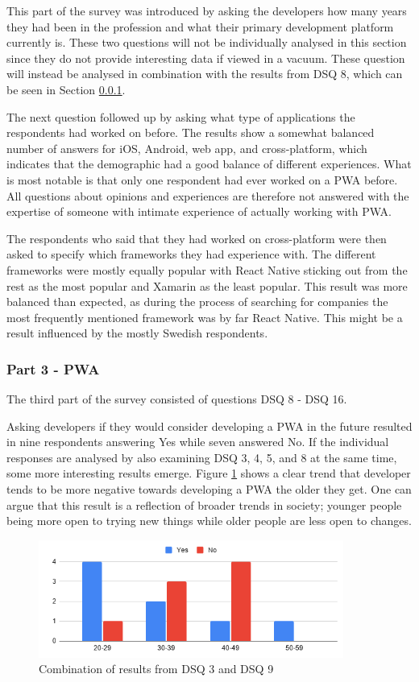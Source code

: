 \documentclass[a4paper,12pt]{article}
\begin{document}
This part of the survey was introduced by asking the developers how many years they had been in the profession and what their primary development platform currently is. These two questions will not be individually analysed in this section since they do not provide interesting data if viewed in a vacuum. These question will instead be analysed in combination with the results from DSQ 8, which can be seen in Section \ref{Analysis_devSurvey_part3}.

The next question followed up by asking what type of applications the respondents had worked on before. The results show a somewhat balanced number of answers for iOS, Android, web app, and cross-platform, which indicates that the demographic had a good balance of different experiences. What is most notable is that only one respondent had ever worked on a PWA before. All questions about opinions and experiences are therefore not answered with the expertise of someone with intimate experience of actually working with PWA.

The respondents who said that they had worked on cross-platform were then asked to specify which frameworks they had experience with. The different frameworks were mostly equally popular with React Native sticking out from the rest as the most popular and Xamarin as the least popular. This result was more balanced than expected, as during the process of searching for companies the most frequently mentioned framework was by far React Native. This might be a result influenced by the mostly Swedish respondents.


\subsubsection{Part 3 - PWA}
\label{Analysis_devSurvey_part3}
The third part of the survey consisted of questions DSQ 8 - DSQ 16. 

Asking developers if they would consider developing a PWA in the future resulted in nine respondents answering Yes while seven answered No. If the individual responses are analysed by also examining DSQ 3, 4, 5, and 8 at the same time, some more interesting results emerge.  Figure \ref{fig:analysis_age} shows a clear trend that developer tends to be more negative towards developing a PWA the older they get. One can argue that this result is a reflection of broader trends in society; younger people being more open to trying new things while older people are less open to changes.

\begin{figure}[ht!]
    \centering
    \includegraphics[width=10cm]{img/Analysis/age.png}
    \caption{Combination of results from DSQ 3 and DSQ 9 }
    \label{fig:analysis_age}
\end{figure}
\end{document}
